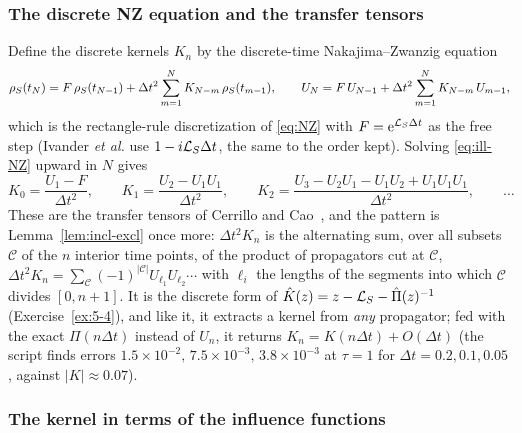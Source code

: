 \subsubsection{The discrete NZ equation and the transfer tensors}

Define the discrete kernels $K_n$ by the discrete-time Nakajima--Zwanzig equation
\begin{equation}
  \rho_{S}(t_N)=F\,\rho_{S}(t_{N-1})+\Delta t^2\sum_{m=1}^{N}K_{N-m}\,\rho_{S}(t_{m-1}),\qquad
  U_N=F\,U_{N-1}+\Delta t^2\sum_{m=1}^{N}K_{N-m}\,U_{m-1},
  \label{eq:ill-NZ}
\end{equation}
which is the rectangle-rule discretization of \cref{eq:NZ} with $F=\mathrm{e}^{\mathcal{L}_S\Delta t}$ as the free step (Ivander \emph{et al.} use $1-i\mathcal{L}_S\Delta t$, the same to the order kept).
Solving \cref{eq:ill-NZ} upward in $N$ gives
\begin{equation}
  K_0=\frac{U_1-F}{\Delta t^2},\qquad
  K_1=\frac{U_2-U_1U_1}{\Delta t^2},\qquad
  K_2=\frac{U_3-U_2U_1-U_1U_2+U_1U_1U_1}{\Delta t^2},\qquad\dots
  \label{eq:ill-ttm}
\end{equation}
These are the transfer tensors of Cerrillo and Cao~\cite{CerrilloCao2014}, and the pattern is Lemma~\ref{lem:incl-excl} once more: $\Delta t^2K_n$ is the alternating sum, over all subsets $\mathcal C$ of the $n$ interior time points, of the product of propagators cut at $\mathcal C$, $\Delta t^2K_n=\sum_{\mathcal C}(-1)^{|\mathcal C|}U_{\ell_1}U_{\ell_2}\cdots$ with $\ell_i$ the lengths of the segments into which $\mathcal C$ divides $[0,n+1]$.
It is the discrete form of $\hat K(z)=z-\mathcal{L}_S-\hat\Pi(z)^{-1}$ (Exercise~\ref{ex:5-4}), and like it, it extracts a kernel from \emph{any} propagator; fed with the exact $\Pi(n\Delta t)$ instead of $U_n$, it returns $K_n=K(n\Delta t)+O(\Delta t)$ (the script finds errors $1.5\times10^{-2},\,7.5\times10^{-3},\,3.8\times10^{-3}$ at $\tau=1$ for $\Delta t=0.2,0.1,0.05$, against $|K|\approx0.07$).

\subsubsection{The kernel in terms of the influence functions}

